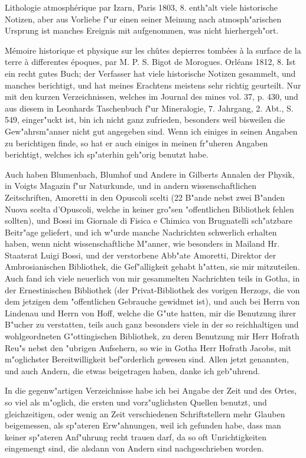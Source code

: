 \documentclass[a4paper, 11pt, oneside, polutonikogreek, german]{article}
\begin{document}
Lithologie atmosphérique par Izarn, Paris 1803, 8. enth"alt viele historische Notizen, aber aus Vorliebe f"ur einen seiner Meinung nach atmosph"arischen Ursprung ist manches Ereignis mit aufgenommen, was nicht hierhergeh"ort.

Mémoire historique et physique sur les chûtes depierres tombées à la surface de la terre à differentes époques, par M. P. S. Bigot de Morogues. Orléans 1812, 8. Ist ein recht gutes Buch; der Verfasser hat viele historische Notizen gesammelt, und manches berichtigt, und hat meines Erachtens meistens sehr richtig geurteilt. Nur mit den kurzen Verzeichnissen, welches im Journal des mines vol. 37, p. 430, und aus diesem in Leonhards Taschenbuch f"ur Mineralogie, 7. Jahrgang, 2. Abt., S. 549, einger"uckt ist, bin ich nicht ganz zufrieden, besonders weil bisweilen die Gew"ahrsm"anner nicht gut angegeben sind. Wenn ich einiges in seinen Angaben zu berichtigen finde, so hat er auch einiges in meinen fr"uheren Angaben berichtigt, welches ich sp"aterhin geh"orig benutzt habe.

Auch haben Blumenbach, Blumhof und Andere in Gilberts Annalen der Physik, in Voigts Magazin f"ur Naturkunde, und in andern wissenschaftlichen Zeitschriften, Amoretti in den Opuscoli scelti (22 B"ande nebst zwei B"anden Nuova scelta d'Opuscoli, welche in keiner gro"sen "offentlichen Bibliothek fehlen sollten), und Bossi im Giornale di Fisica e Chimica von Brugnatelli sch"atzbare Beitr"age geliefert, und ich w"urde manche Nachrichten schwerlich erhalten haben, wenn nicht wissenschaftliche M"anner, wie besonders in Mailand Hr. Staatsrat Luigi Bossi, und der verstorbene Abb"ate Amoretti, Direktor der Ambrosianischen Bibliothek, die Gef"alligkeit gehabt h"atten, sie mir mitzuteilen. Auch fand ich viele neuerlich von mir gesammelten Nachrichten teils in Gotha, in der Ernestinischen Bibliothek (der Privat-Bibliothek des vorigen Herzogs, die von dem jetzigen dem "offentlichen Gebrauche gewidmet ist), und auch bei Herrn von Lindenau und Herrn von Hoff, welche die G"ute hatten, mir die Benutzung ihrer B"ucher zu verstatten, teils auch ganz besonders viele in der so reichhaltigen und wohlgeordneten G"ottingischen Bibliothek, zu deren Benutzung mir Herr Hofrath Reu"s nebst den "ubrigen Aufsehern, so wie in Gotha Herr Hofrath Jacobs, mit m"oglichster Bereitwilligkeit bef"orderlich gewesen sind. Allen jetzt genannten, und auch Andern, die etwas beigetragen haben, danke ich geb"uhrend.

In die gegenw"artigen Verzeichnisse habe ich bei Angabe der Zeit und des Ortes, so viel als m"oglich, die ersten und vorz"uglichsten Quellen benutzt, und gleichzeitigen, oder wenig an Zeit verschiedenen Schriftstellern mehr Glauben beigemessen, als sp"ateren Erw"ahnungen, weil ich gefunden habe, dass man keiner sp"ateren Anf"uhrung recht trauen darf, da so oft Unrichtigkeiten eingemengt sind, die alsdann von Andern sind nachgeschrieben worden.
\end{document}
